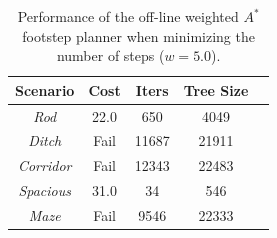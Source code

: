 \begin{table}
    \centering
    \begin{tabular}{*{5}{c}}
        Scenario & Cost & Iters & Tree Size \\
        \hline
        \textit{Rod} & 22.0 & 650 & 4049 \\
        \textit{Ditch} & Fail & 11687 & 21911 \\
        \textit{Corridor} & Fail & 12343 & 22483 \\
        \textit{Spacious} & 31.0 & 34 & 546 \\
        \textit{Maze} & Fail & 9546 & 22333
    \end{tabular}
    \caption{Performance of the off-line weighted $A^\ast$ footstep planner
        when minimizing the number of steps ($w=5.0$).}
    \label{tab:benchmark-wastar-w5}
\end{table}
